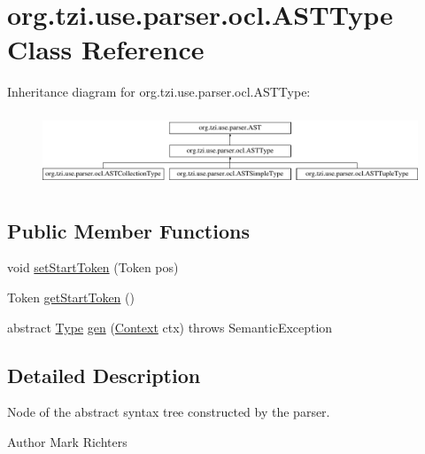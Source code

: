 \hypertarget{classorg_1_1tzi_1_1use_1_1parser_1_1ocl_1_1_a_s_t_type}{\section{org.\-tzi.\-use.\-parser.\-ocl.\-A\-S\-T\-Type Class Reference}
\label{classorg_1_1tzi_1_1use_1_1parser_1_1ocl_1_1_a_s_t_type}
}
Inheritance diagram for org.\-tzi.\-use.\-parser.\-ocl.\-A\-S\-T\-Type\-:\begin{figure}[H]
\begin{center}
\leavevmode
\includegraphics[height=2.213439cm]{classorg_1_1tzi_1_1use_1_1parser_1_1ocl_1_1_a_s_t_type}
\end{center}
\end{figure}
\subsection*{Public Member Functions}
\begin{DoxyCompactItemize}
\item 
void \hyperlink{classorg_1_1tzi_1_1use_1_1parser_1_1ocl_1_1_a_s_t_type_a3b1e0a822c9284671f2349aa682148c0}{set\-Start\-Token} (Token pos)
\item 
Token \hyperlink{classorg_1_1tzi_1_1use_1_1parser_1_1ocl_1_1_a_s_t_type_a9589444a3dfe5ee364ef0c6f62c28529}{get\-Start\-Token} ()
\item 
abstract \hyperlink{interfaceorg_1_1tzi_1_1use_1_1uml_1_1ocl_1_1type_1_1_type}{Type} \hyperlink{classorg_1_1tzi_1_1use_1_1parser_1_1ocl_1_1_a_s_t_type_a04270f6a9a3bccecb74c48f7829aca52}{gen} (\hyperlink{classorg_1_1tzi_1_1use_1_1parser_1_1_context}{Context} ctx)  throws Semantic\-Exception
\end{DoxyCompactItemize}


\subsection{Detailed Description}
Node of the abstract syntax tree constructed by the parser.

\begin{DoxyAuthor}{Author}
Mark Richters 
\end{DoxyAuthor}



